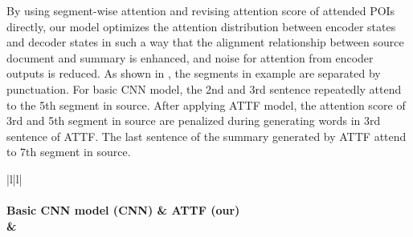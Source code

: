By using segment-wise attention and revising attention score of attended POIs directly,
our model optimizes the
attention distribution between encoder states and decoder states in such a way that
the alignment relationship between source document and summary is enhanced, 
and noise for attention from encoder outputs is reduced. 
As shown in , the segments in example are separated by punctuation.
For basic CNN model, the 2nd and 3rd sentence repeatedly attend to 
the 5th segment in source.
After applying ATTF model, 
the attention score of 3rd and 5th segment in source are penalized 
during generating words in 3rd sentence of ATTF.
The last sentence of the summary generated by ATTF attend to 7th segment in source.

\begin{table}[th!]
\begin{center}
\scriptsize
\begin{tabular}{|l|l|}%
\hline 
{} \\
\hline
{} \\
\hline 
\bf Basic CNN model (CNN) & \bf ATTF (our) \\
\hline 
{} 
&  \\
\hline
\end{tabular}
\end{center}
\caption{\label{tab:attn_exp} Summary generated by the basic CNN model and ATTF model}
\end{table}
\DIFaddbegin {}\DIFaddend 


